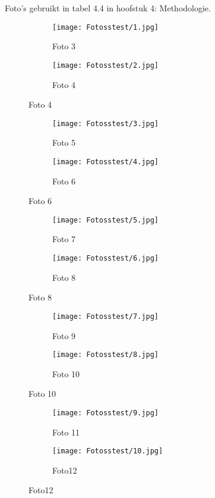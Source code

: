 \documentclass{bachproef-tin}
\begin{document}
Foto's gebruikt in tabel 4.4 in hoofstuk 4: Methodologie. 
\begin{figure}[h]
    \centering
    \begin{subfigure}{0.45\textwidth}
        \centering
        \texttt{[image: Fotosstest/1.jpg]}
        \caption{Foto 3}
    \end{subfigure}%
    \begin{subfigure}{0.45\textwidth}
        \centering
        \texttt{[image: Fotosstest/2.jpg]}
        \caption{Foto 4}
    \end{subfigure}
\end{figure}
\begin{figure}[h]
    \centering
    \begin{subfigure}{0.45\textwidth}
        \centering
        \texttt{[image: Fotosstest/3.jpg]}
        \caption{Foto 5}
    \end{subfigure}%
    \begin{subfigure}{0.45\textwidth}
        \centering
        \texttt{[image: Fotosstest/4.jpg]}
        \caption{Foto 6}
    \end{subfigure}
\end{figure}
\begin{figure}[h]
    \centering
    \begin{subfigure}{0.45\textwidth}
        \centering
        \texttt{[image: Fotosstest/5.jpg]}
        \caption{Foto 7}
    \end{subfigure}%
    \begin{subfigure}{0.45\textwidth}
        \centering
        \texttt{[image: Fotosstest/6.jpg]}
        \caption{Foto 8}
    \end{subfigure}
\end{figure}
\begin{figure}[h]
    \centering
    \begin{subfigure}{0.45\textwidth}
        \centering
        \texttt{[image: Fotosstest/7.jpg]}
        \caption{Foto 9}
    \end{subfigure}%
    \begin{subfigure}{0.45\textwidth}
        \centering
        \texttt{[image: Fotosstest/8.jpg]}
        \caption{Foto 10}
    \end{subfigure}
\end{figure}
\begin{figure}[h]
    \centering
    \begin{subfigure}{0.45\textwidth}
        \centering
        \texttt{[image: Fotosstest/9.jpg]}
        \caption{Foto 11}
    \end{subfigure}%
    \begin{subfigure}{0.45\textwidth}
        \centering
        \texttt{[image: Fotosstest/10.jpg]}
        \caption{Foto12}
    \end{subfigure}
\end{figure}
\end{document}
